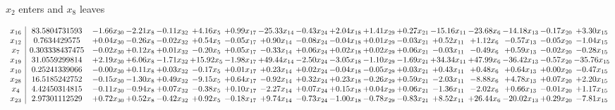 \documentclass[9pt]{article}
\begin{document}
 $ x_{2} $ enters and $ x_{8} $ leaves 

 \[\begin{array}{c| c c@{\hskip 2pt} c@{\hskip 2pt} c@{\hskip 2pt} c@{\hskip 2pt} c@{\hskip 2pt} c@{\hskip 2pt} c@{\hskip 2pt} c@{\hskip 2pt} c@{\hskip 2pt} c@{\hskip 2pt} c@{\hskip 2pt} c@{\hskip 2pt} c@{\hskip 2pt} c@{\hskip 2pt} c@{\hskip 2pt} }
 x_{16}   &  83.5804731593 & -1.66 x_{30} & -2.21 x_{8} & -0.11 x_{32} & +  4.16 x_{5} & +  0.99 x_{17} & -25.33 x_{14} & -0.43 x_{24} & +  2.04 x_{18} & +  1.41 x_{29} & +  0.27 x_{21} & -15.16 x_{11} & -23.68 x_{6} & -14.18 x_{13} & -0.17 x_{20} & +  3.30 x_{15}\\
 x_{12}   &  0.7634429575 & +  0.04 x_{30} & -0.26 x_{8} & -0.02 x_{32} & +  0.54 x_{5} & -0.05 x_{17} & +  0.90 x_{14} & -0.08 x_{24} & -0.04 x_{18} & +  0.01 x_{29} & -0.03 x_{21} & +  0.52 x_{11} & +  1.12 x_{6} & -0.57 x_{13} & -0.05 x_{20} & -1.04 x_{15}\\
 x_{7}   &  0.303338437475 & -0.02 x_{30} & +  0.12 x_{8} & +  0.01 x_{32} & -0.20 x_{5} & +  0.05 x_{17} & -0.33 x_{14} & +  0.06 x_{24} & +  0.02 x_{18} & +  0.02 x_{29} & +  0.06 x_{21} & -0.03 x_{11} & -0.49 x_{6} & +  0.59 x_{13} & -0.02 x_{20} & -0.28 x_{15}\\
 x_{19}   &  31.0559299814 & +  2.19 x_{30} & +  6.06 x_{8} & -1.71 x_{32} & + 15.92 x_{5} & -1.98 x_{17} & + 49.44 x_{14} & -2.50 x_{24} & -3.05 x_{18} & -1.10 x_{29} & -1.69 x_{21} & + 34.34 x_{11} & + 47.99 x_{6} & -36.42 x_{13} & -0.57 x_{20} & -35.76 x_{15}\\
 x_{10}   &  0.25241339066 & -0.00 x_{30} & +  0.11 x_{8} & +  0.03 x_{32} & -0.17 x_{5} & +  0.01 x_{17} & +  0.23 x_{14} & +  0.02 x_{24} & -0.04 x_{18} & -0.05 x_{29} & +  0.03 x_{21} & +  0.43 x_{11} & +  0.48 x_{6} & +  0.64 x_{13} & +  0.00 x_{20} & -0.47 x_{15}\\
 x_{28}   &  16.5185242752 & -0.15 x_{30} & -1.30 x_{8} & +  0.49 x_{32} & -9.15 x_{5} & +  0.64 x_{17} & -0.92 x_{14} & +  0.32 x_{24} & +  0.23 x_{18} & -0.26 x_{29} & +  0.59 x_{21} & -2.03 x_{11} & -8.88 x_{6} & +  4.78 x_{13} & +  0.07 x_{20} & +  2.20 x_{15}\\
 x_{4}   &  4.42450314815 & -0.11 x_{30} & -0.94 x_{8} & +  0.07 x_{32} & -0.38 x_{5} & +  0.10 x_{17} & -2.27 x_{14} & +  0.07 x_{24} & +  0.15 x_{18} & +  0.04 x_{29} & +  0.06 x_{21} & -1.36 x_{11} & -2.02 x_{6} & +  0.66 x_{13} & -0.01 x_{20} & +  1.17 x_{15}\\
 x_{23}   &  2.97301112529 & +  0.72 x_{30} & +  0.52 x_{8} & -0.42 x_{32} & +  0.92 x_{5} & -0.18 x_{17} & +  9.74 x_{14} & -0.73 x_{24} & -1.00 x_{18} & -0.78 x_{29} & -0.83 x_{21} & +  8.52 x_{11} & + 26.44 x_{6} & -20.02 x_{13} & +  0.29 x_{20} & -7.81 x_{15}\\

\end{array}\]
\end{document}
